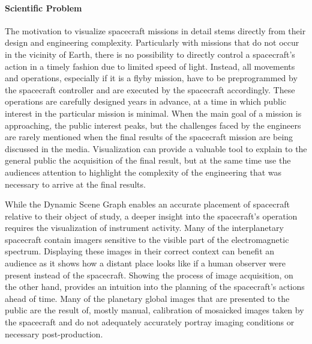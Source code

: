 \paragraph{Scientific Problem} \label{contributions:astro:gb:problem}
The motivation to visualize spacecraft missions in detail stems directly from their design and engineering complexity.  Particularly with missions that do not occur in the vicinity of Earth, there is no possibility to directly control a spacecraft's action in a timely fashion due to limited speed of light.  Instead, all movements and operations, especially if it is a flyby mission, have to be preprogrammed by the spacecraft controller and are executed by the spacecraft accordingly.  These operations are carefully designed years in advance, at a time in which public interest in the particular mission is minimal.  When the main goal of a mission is approaching, the public interest peaks, but the challenges faced by the engineers are rarely mentioned when the final results of the spacecraft mission are being discussed in the media.  Visualization can provide a valuable tool to explain to the general public the acquisition of the final result, but at the same time use the audiences attention to highlight the complexity of the engineering that was necessary to arrive at the final results.

While the Dynamic Scene Graph enables an accurate placement of spacecraft relative to their object of study, a deeper insight into the spacecraft's operation requires the visualization of instrument activity.  Many of the interplanetary spacecraft contain imagers sensitive to the visible part of the electromagnetic spectrum.  Displaying these images in their correct context can benefit an audience as it shows how a distant place looks like if a human observer were present instead of the spacecraft.  Showing the process of image acquisition, on the other hand, provides an intuition into the planning of the spacecraft's actions ahead of time.  Many of the planetary global images that are presented to the public are the result of, mostly manual, calibration of mosaicked images taken by the spacecraft and do not adequately accurately portray imaging conditions or necessary post-production.


